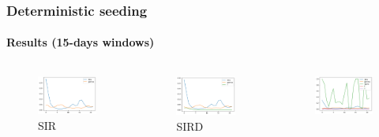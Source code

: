 \documentclass[aspectratio=43]{beamer}
\begin{document}
\begin{frame}
	\frametitle{Deterministic seeding}
	\framesubtitle{Results (15-days windows)}
	\begin{columns}
		\begin{figure}
			\includegraphics[width=\textwidth]{img/sir_det_15.png}
			\caption{SIR}
		\end{figure}
		\begin{figure}
			\includegraphics[width=\textwidth]{img/sird_det_15.png}
			\caption{SIRD}
		\end{figure}
		\begin{figure}
			\includegraphics[width=\textwidth]{img/seird_det_1_15.png}

\end{figure}
\end{columns}
\end{frame}
\end{document}
